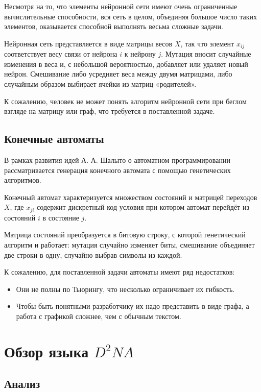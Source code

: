 \documentclass[utf8,a5paper,portrait,10pt,twoside]{eskdtext}
\begin{document}
Несмотря на то, что элементы нейронной сети имеют очень ограниченные
вычислительные способности, вся сеть в целом, объединяя большое число таких
элементов, оказывается способной выполнять весьма сложные задачи.

Нейронная сеть представляется в виде матрицы весов $X$, так что элемент
$x_{ij}$ соответствует весу связи от нейрона $i$ к нейрону $j$. Мутация
вносит случайные изменения в веса и, с небольшой вероятностью, добавляет или
удаляет новый нейрон. Смешивание либо усредняет веса между двумя матрицами, либо
случайным образом выбирает ячейки из матриц-«родителей».

К сожалению, человек не может понять алгоритм нейронной сети при беглом взгляде
на матрицу или граф, что требуется в поставленной задаче.

\subsection{Конечные автоматы}

В рамках развития идей А. А. Шалыто о автоматном программировании
рассматривается генерация конечного автомата с помощью генетических
алгоритмов.\cite{shalyto}

Конечный автомат характеризуется множеством состояний и матрицей переходов $X$,
где $x_{ji}$ содержит дискретный код условия при котором автомат перейдёт из
состояний $i$ в состояние $j$.

Матрица состояний преобразуется в битовую строку, с которой генетический
алгоритм и работает: мутация случайно изменяет биты, смешивание объединяет две
строки в одну, случайно выбрав символы из каждой.

К сожалению, для поставленной задачи автоматы имеют ряд недостатков:
\begin{itemize}
  \item Они не полны по Тьюрингу, что несколько ограничивает их гибкость.
  \item Чтобы быть понятными разработчику их надо представить в виде графа, а
        работа с графикой сложнее, чем с обычным текстом.
\end{itemize}

\newpage
\section{Обзор языка $D^2NA$}

\subsection{Анализ}
\end{document}

